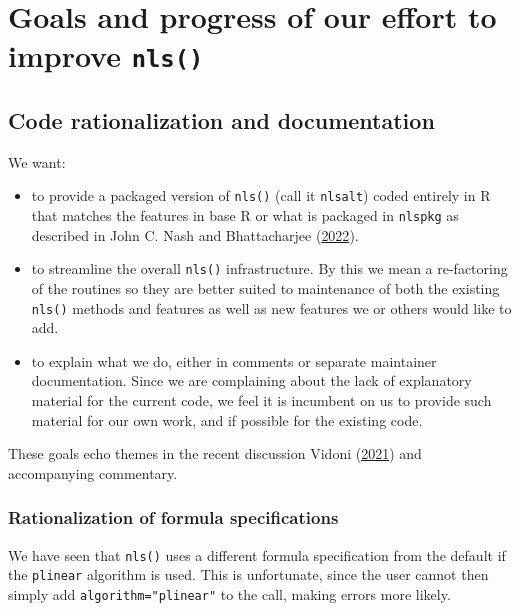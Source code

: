 \documentclass[
]{article}
\begin{document}
\hypertarget{goals-and-progress-of-our-effort-to-improve-nls}{%
\section{\texorpdfstring{Goals and progress of our effort to improve
\texttt{nls()}}{Goals and progress of our effort to improve nls()}}\label{goals-and-progress-of-our-effort-to-improve-nls}}

\hypertarget{code-rationalization-and-documentation}{%
\subsection{Code rationalization and
documentation}\label{code-rationalization-and-documentation}}

We want:

\begin{itemize}
\item
  to provide a packaged version of \texttt{nls()} (call it
  \texttt{nlsalt}) coded entirely in R that matches the features in base
  R or what is packaged in \texttt{nlspkg} as described in John C. Nash
  and Bhattacharjee (\protect\hyperlink{ref-PkgFromRbase22}{2022}).
\item
  to streamline the overall \texttt{nls()} infrastructure. By this we
  mean a re-factoring of the routines so they are better suited to
  maintenance of both the existing \texttt{nls()} methods and features
  as well as new features we or others would like to add.
\item
  to explain what we do, either in comments or separate maintainer
  documentation. Since we are complaining about the lack of explanatory
  material for the current code, we feel it is incumbent on us to
  provide such material for our own work, and if possible for the
  existing code.
\end{itemize}

These goals echo themes in the recent discussion Vidoni
(\protect\hyperlink{ref-Vidoni21}{2021}) and accompanying commentary.

\hypertarget{rationalization-of-formula-specifications}{%
\subsubsection{Rationalization of formula
specifications}\label{rationalization-of-formula-specifications}}

We have seen that \texttt{nls()} uses a different formula specification
from the default if the \texttt{plinear} algorithm is used. This is
unfortunate, since the user cannot then simply add
\texttt{algorithm="plinear"} to the call, making errors more likely.
\end{document}
